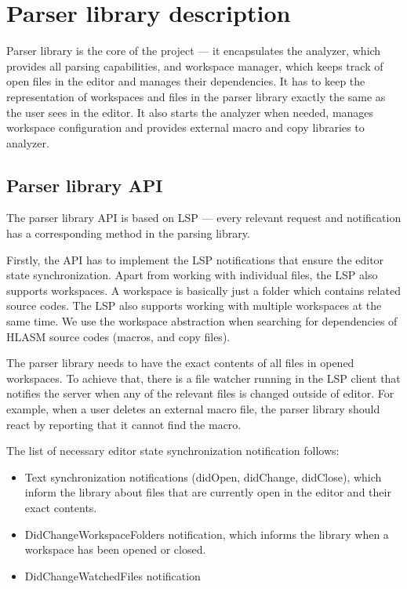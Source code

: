 \section{Parser library description}

Parser library is the core of the project --- it encapsulates the analyzer, which provides all parsing capabilities, and workspace manager, which keeps track of open files in the editor and manages their dependencies. It has to keep the representation of workspaces and files in the parser library exactly the same as the user sees in the editor. It also starts the analyzer when needed, manages workspace configuration and provides external macro and copy libraries to analyzer.

\subsection{Parser library API}
The parser library API is based on LSP --- every relevant request and notification has a corresponding method in the parsing library.

Firstly, the API has to implement the LSP notifications that ensure the editor state synchronization. Apart from working with individual files, the LSP also supports workspaces. A workspace is basically just a folder which contains related source codes. The LSP also supports working with multiple workspaces at the same time. We use the workspace abstraction when searching for dependencies of HLASM source codes (macros, and copy files).

The parser library needs to have the exact contents of all files in opened workspaces. To achieve that, there is a file watcher running in the LSP client that notifies the server when any of the relevant files is changed outside of editor. For example, when a user deletes an external macro file, the parser library should react by reporting that it cannot find the macro.

The list of necessary editor state synchronization notification follows:
\begin{itemize}
	\item Text synchronization notifications (didOpen, didChange, didClose), which inform the library about files that are currently open in the editor and their exact contents.
	\item DidChangeWorkspaceFolders notification, which informs the library when a workspace has been opened or closed.
	\item DidChangeWatchedFiles notification
\end{itemize}



